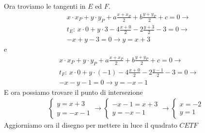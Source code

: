 Ora troviamo le tangenti in $E$ ed $F$.
\begin{align*}
  &x\cdot x_P+y\cdot y_P+a\frac{x+x_P}{2}+b\frac{y+y_P}{2}+c = 0\rightarrow\\
  &t_E:\, x\cdot0+y\cdot3-4\frac{x+0}{2}-2\frac{y+3}{2}-3=0 \rightarrow\\
  &\boxed{-x+y-3=0 \rightarrow y = x+3}
\end{align*}
e
\begin{align*}
  &x\cdot x_P+y\cdot y_P+a\frac{x+x_P}{2}+b\frac{y+y_P}{2}+c = 0\rightarrow\\
  &t_F:\, x\cdot0+y\cdot(-1)-4\frac{x+0}{2}-2\frac{y-1}{2}-3=0\rightarrow\\
  &\boxed{-x-y-1=0\rightarrow y=-x-1}
\end{align*}
E ora possiamo trovare il punto di intersezione
\begin{align*}
  \begin{cases}
    y=x+3\\
    y=-x-1
  \end{cases}\rightarrow
  \begin{cases}
    -x-1=x+3\\
    y=-x-1
  \end{cases}\rightarrow
  \begin{cases}
    x = -2\\
    y=1
  \end{cases}
\end{align*}
Aggiorniamo ora il disegno per mettere in luce il quadrato $CETF$
\begin{center}
\end{center}

